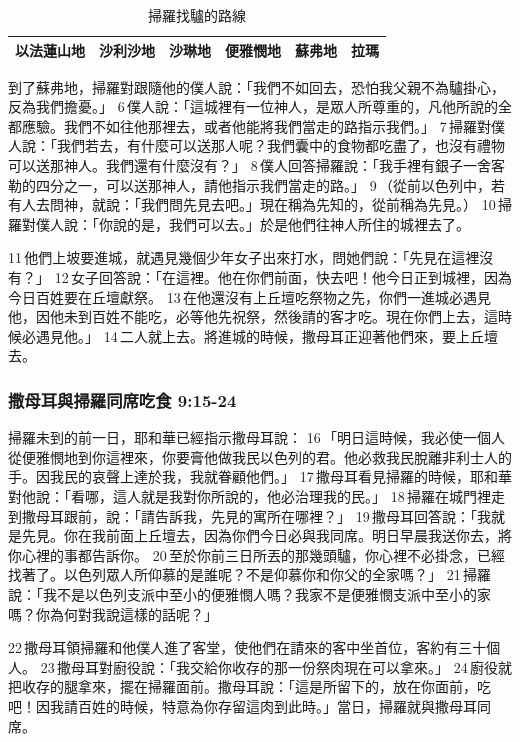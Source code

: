\begin{table}[!hbp]
\centering 
\begin{tabular}{|p{2cm}|p{2cm}|p{2cm}|p{2cm}|p{2cm}|p{2cm}|}
\hline
\hline
以法蓮山地&沙利沙地& 沙琳地& 便雅憫地& 蘇弗地&拉瑪 \\\hline
\end{tabular}
\caption{掃羅找驢的路線}
\end{table}
到了蘇弗地，掃羅對跟隨他的僕人說：「我們不如回去，恐怕我父親不為驢掛心，反為我們擔憂。」 6 僕人說：「這城裡有一位神人，是眾人所尊重的，凡他所說的全都應驗。我們不如往他那裡去，或者他能將我們當走的路指示我們。」 7 掃羅對僕人說：「我們若去，有什麼可以送那人呢？我們囊中的食物都吃盡了，也沒有禮物可以送那神人。我們還有什麼沒有？」 8 僕人回答掃羅說：「我手裡有銀子一舍客勒的四分之一，可以送那神人，請他指示我們當走的路。」 9 （從前以色列中，若有人去問神，就說：「我們問先見去吧。」現在稱為先知的，從前稱為先見。） 10 掃羅對僕人說：「你說的是，我們可以去。」於是他們往神人所住的城裡去了。

11 他們上坡要進城，就遇見幾個少年女子出來打水，問她們說：「先見在這裡沒有？」 12 女子回答說：「在這裡。他在你們前面，快去吧！他今日正到城裡，因為今日百姓要在丘壇獻祭。 13 在他還沒有上丘壇吃祭物之先，你們一進城必遇見他，因他未到百姓不能吃，必等他先祝祭，然後請的客才吃。現在你們上去，這時候必遇見他。」 14 二人就上去。將進城的時候，撒母耳正迎著他們來，要上丘壇去。

\subsubsection{撒母耳與掃羅同席吃食 9:15-24}
掃羅未到的前一日，耶和華已經指示撒母耳說： 16 「明日這時候，我必使一個人從便雅憫地到你這裡來，你要膏他做我民以色列的君。他必救我民脫離非利士人的手。因我民的哀聲上達於我，我就眷顧他們。」 17 撒母耳看見掃羅的時候，耶和華對他說：「看哪，這人就是我對你所說的，他必治理我的民。」 18 掃羅在城門裡走到撒母耳跟前，說：「請告訴我，先見的寓所在哪裡？」 19 撒母耳回答說：「我就是先見。你在我前面上丘壇去，因為你們今日必與我同席。明日早晨我送你去，將你心裡的事都告訴你。 20 至於你前三日所丟的那幾頭驢，你心裡不必掛念，已經找著了。以色列眾人所仰慕的是誰呢？不是仰慕你和你父的全家嗎？」 21 掃羅說：「我不是以色列支派中至小的便雅憫人嗎？我家不是便雅憫支派中至小的家嗎？你為何對我說這樣的話呢？」

22 撒母耳領掃羅和他僕人進了客堂，使他們在請來的客中坐首位，客約有三十個人。 23 撒母耳對廚役說：「我交給你收存的那一份祭肉現在可以拿來。」 24 廚役就把收存的腿拿來，擺在掃羅面前。撒母耳說：「這是所留下的，放在你面前，吃吧！因我請百姓的時候，特意為你存留這肉到此時。」當日，掃羅就與撒母耳同席。

